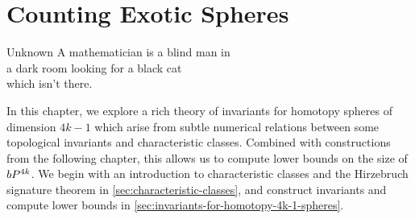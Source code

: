 \chapter{Counting Exotic Spheres}\label{chap:invariants}

\begin{epigraph}{15em}{Unknown}
	A mathematician is a blind man in \\
	a dark room looking for a black cat \\
	which isn’t there.
\end{epigraph}

In this chapter, we explore a rich theory of invariants for homotopy spheres of dimension $4k-1$ which arise from subtle numerical relations between some topological invariants and characteristic classes. Combined with constructions from the following chapter, this allows us to compute lower bounds on the size of $bP^{4k}$. We begin with an introduction to characteristic classes and the Hirzebruch signature theorem in \cref{sec:characteristic-classes}, and construct invariants and compute lower bounds in \cref{sec:invariants-for-homotopy-4k-1-spheres}.



